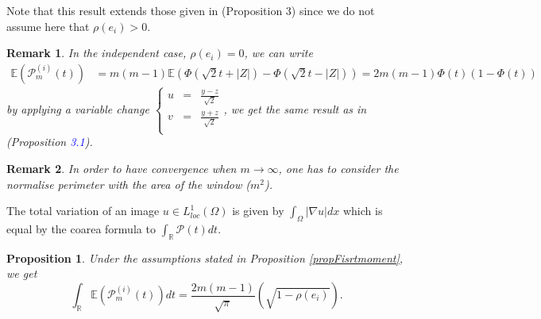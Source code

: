 \documentclass[12pt]{article}
\theoremstyle{Theorem}
\newtheorem{Proposition}[Theorem]{Proposition}
\newtheorem{remark}{Remark}
\begin{document}
Note that this result extends those given in \cite{HermineAgnes} (Proposition 3) since we do not assume here that $\rho(e_i) > 0$. 

\begin{remark}
\label{iidCase}
In the independent case, $\rho(e_i) = 0$, we can write
{\small
\begin{align*}
\mathbb{E}\left(\mathcal{P}^{\scriptscriptstyle  (i)}_{m}(t) \right) & = m(m-1)\mathbb{E}\left(\Phi\left(\sqrt{2}t + |Z|\right) - \Phi\left(\sqrt{2}t - |Z|\right)\right) = 2m(m-1)\Phi(t)\left(1-\Phi(t)\right) 
\end{align*}}
by applying a variable change {\small$\left\{\begin{array}{rcl}
u & = & \frac{y - z}{\sqrt{2}} \\
v & = & \frac{y+z}{\sqrt{2}} \\
\end{array}\right.$}, we get the same result as in \cite{Psymetrie} (Proposition \textcolor{blue}{3.1}).
\end{remark}
\begin{remark}
In order to have convergence when $m \to \infty$, one has to consider the normalise perimeter with the area of the window ($m^2$).
\end{remark}
The total variation of an image $u \in L^{1}_{loc}(\Omega)$ is given by $\int_{\Omega}|\nabla u|dx$ which is equal by the coarea formula to $\int_{\mathbb{R}}\mathcal{P}(t)dt$.
\begin{Proposition}
Under the assumptions stated in Proposition \ref{propFisrtmoment}, we get 
\begin{equation}
\label{totalvariation}
\int_{\mathbb{R}} \mathbb{E}\left(\mathcal{P}^{(i)}_{m}(t)\right) dt = \frac{2m(m-1)}{\sqrt{\pi}}\left(\sqrt{1-\rho(e_i)}  \right).
\end{equation}
\end{Proposition}
\end{document}
